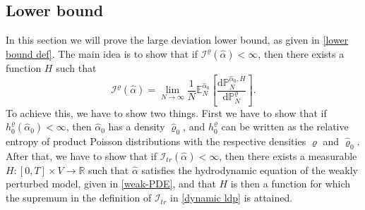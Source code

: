 \documentclass[11pt]{article}
\numberwithin{equation}{section}
\theoremstyle{definition}
\theoremstyle{plain}
\newcommand{\E}{\mathbb{E}}
\newcommand{\p}{\mathbb{P}}
\newcommand{\dd}{\mathrm{d}}
\begin{document}
\subsection{Lower bound}
In this section we will prove the large deviation lower bound, as given in \eqref{lower bound def}. The main idea is to show that if $\mathcal{I}^{\varrho}(\widehat{\alpha})<\infty$,  then there exists a function $H$ such that 
    \begin{equation}
        \mathcal{I}^{\varrho}(\widehat{\alpha}) = \lim_{N\to\infty} \frac{1}{N}\E^{\widehat{\alpha}_0}_N \left[\frac{\dd \p^{\widehat{\alpha}_0,H}_N}{\dd \p^{\varrho}_N}\right].
    \end{equation}
To achieve this, we have to show two things. First we have to show that if $h^{\varrho}_0(\widehat{\alpha}_0)<\infty$, then $\widehat{\alpha}_0$ has a density $\widehat{\varrho}_0$, and $h^{\varrho}_0$ can be written as the relative entropy of product Poisson distributions with the respective densities $\varrho$ and $\widehat{\varrho}_0$. After that, we have to show that if $\mathcal{I}_{tr}(\widehat{\alpha})<\infty$, then there exists a measurable $H:[0,T]\times V \to \mathbb{R}$ such that $\widehat{\alpha}$ satisfies the hydrodynamic equation of the weakly perturbed model, given in \eqref{weak-PDE}, and that $H$ is then a function for which the supremum in the definition of $\mathcal{I}_{tr}$ in \eqref{dynamic ldp} is attained.
\end{document}
